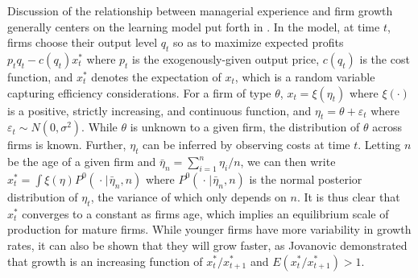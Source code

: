 \documentclass[english]{article}
\begin{document}
Discussion of the relationship between managerial experience and firm 
growth generally centers on the learning model put forth in 
\citet{jovanovic1982}. 
In the model, at time $t$, firms choose their output level $q_t$ so as to 
maximize expected profits $p_t q_t - c(q_t)x_t^*$ where $p_t$ is the 
exogenously-given output price, $c(q_t)$ is the cost function, and $x_t^*$ 
denotes the expectation of $x_t$, which is a random variable capturing 
efficiency considerations. 
For a firm of type $\theta$, $x_t = \xi (\eta_t)$ where $\xi (\cdot)$ is a positive, 
strictly increasing, and continuous function, and 
$\eta_t = \theta + \varepsilon_t$ where $\varepsilon_t \sim N(0,\sigma^2)$. 
While $\theta$ is unknown to a given firm, the distribution of $\theta$ across 
firms is known. 
Further, $\eta_t$ can be inferred by observing costs at time $t$. 
Letting $n$ be the age of a given firm and 
$\bar{\eta}_n = \sum_{i=1}^n \eta_i/n$, we can then write 
$x_t^* = \int \xi(\eta)P^0(\hspace{1pt} \cdot \hspace{1pt} | 
\hspace{1pt} \bar{\eta}_n, n)$ where $P^0(\hspace{1pt} \cdot \hspace{1pt} | 
\hspace{1pt} \bar{\eta}_n, n)$ is the normal posterior distribution of $\eta_t$, 
the variance of which only depends on $n$. 
It is thus clear that $x_t^*$ converges to a constant as firms age, which implies an 
equilibrium scale of production for mature firms. 
While younger firms have more variability in growth rates, it can also be shown 
that they will grow faster, as Jovanovic demonstrated that growth is an increasing 
function of $x_t^*/x_{t+1}^*$ and $E(x_t^*/x_{t+1}^*)>1$. 
\end{document}
